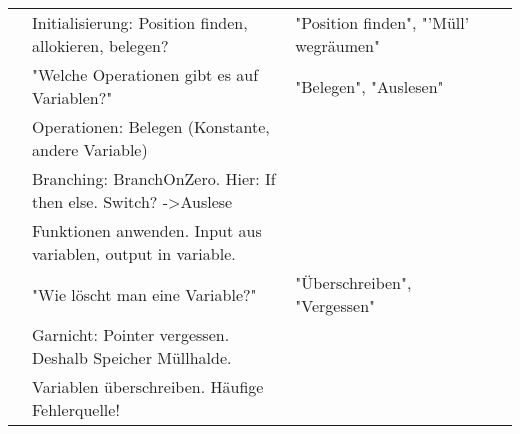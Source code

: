 \documentclass{article}
\begin{document}
\begin{tabularx}{\textwidth}{|X|X|X|X|X|}
                              & Initialisierung: Position finden, allokieren, belegen?                     & "Position finden", "'Müll' wegräumen" &                                                                                          &                                                                             \\
                              & "Welche Operationen gibt es auf Variablen?"                                & "Belegen", "Auslesen"                 &                                                                                          &                                                                             \\
                              & Operationen: Belegen (Konstante, andere Variable)                          &                                       &                                                                                          &                                                                             \\
                              & Branching: BranchOnZero. Hier: If then else. Switch? -\textgreater Auslese &                                       &                                                                                          &                                                                             \\
                              & Funktionen anwenden. Input aus variablen, output in variable.              &                                       &                                                                                          &                                                                             \\
                              & "Wie löscht man eine Variable?"                                            & "Überschreiben", "Vergessen"          &                                                                                          &                                                                             \\
                              & Garnicht: Pointer vergessen. Deshalb Speicher Müllhalde.                   &                                       &                                                                                          &                                                                             \\
                              & Variablen überschreiben. Häufige Fehlerquelle!                             &                                       &                                                                                          &                                                                             \\

\end{tabularx}
\end{document}
